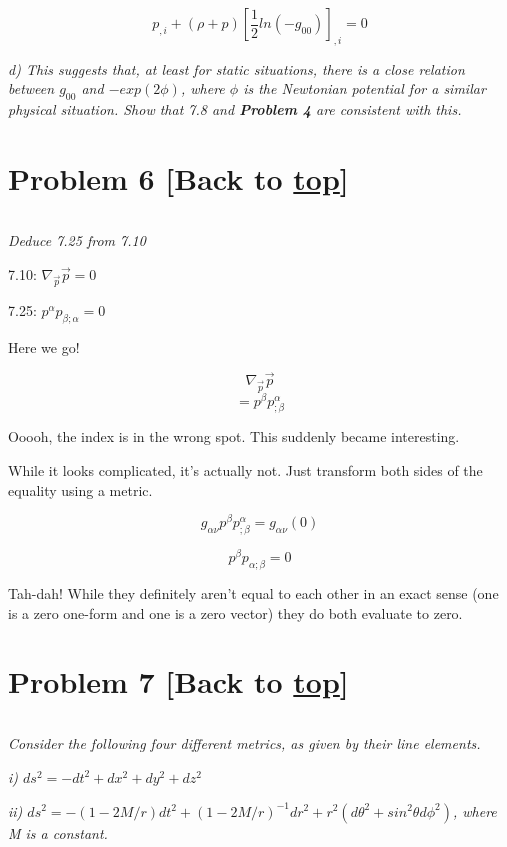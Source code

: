 \documentclass[landscape,letterpaper,10pt,english]{article}
\begin{document}
\[ p_{,i} + (\rho + p) \left[ \frac12 ln(-g_{00}) \right]_{,i} = 0 \]

    

    \emph{d) This suggests that, at least for static situations, there is a
close relation between \(g_{00}\) and \(-exp(2\phi)\), where \(\phi\) is
the Newtonian potential for a similar physical situation. Show that 7.8
and \textbf{Problem 4} are consistent with this.}

    \hypertarget{problem-6-back-to-top}{%
\section{\texorpdfstring{Problem 6 {[}Back to
\hyperref[toc]{top}{]}}{Problem 6 {[}Back to {]}}}\label{problem-6-back-to-top}}

\[\label{P6}\]

\emph{Deduce 7.25 from 7.10}

    7.10: \(\nabla_{\vec p} \vec p = 0\)

7.25: \(p^\alpha p_{\beta;\alpha} = 0\)

Here we go!

\[ \nabla_{\vec p} \vec p \] \[ = p^\beta p^\alpha_{;\beta} \]

Ooooh, the index is in the wrong spot. This suddenly became interesting.

While it looks complicated, it's actually not. Just transform both sides
of the equality using a metric.

\[  g_{\alpha\nu} p^\beta p^\alpha_{;\beta} = g_{\alpha\nu}(0)\]

\[  p^\beta p_{\alpha;\beta} = 0 \]

Tah-dah! While they definitely aren't equal to each other in an exact
sense (one is a zero one-form and one is a zero vector) they do both
evaluate to zero.

    \hypertarget{problem-7-back-to-top}{%
\section{\texorpdfstring{Problem 7 {[}Back to
\hyperref[toc]{top}{]}}{Problem 7 {[}Back to {]}}}\label{problem-7-back-to-top}}

\[\label{P7}\]

\emph{Consider the following four different metrics, as given by their
line elements.}

\emph{i) \(ds^2 = -dt^2+dx^2+dy^2+dz^2\)}

\emph{ii)
\(ds^2 = -(1-2M/r)dt^2+(1-2M/r)^{-1}dr^2+r^2(d\theta^2+ sin^2\theta d\phi^2)\),
where M is a constant.}
\end{document}
